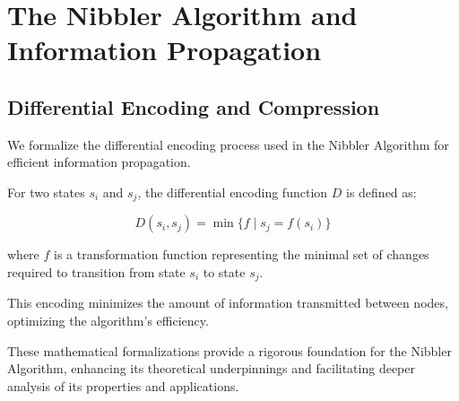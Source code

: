 \section{The Nibbler Algorithm and Information Propagation}

\subsection{Differential Encoding and Compression}

We formalize the differential encoding process used in the Nibbler Algorithm for efficient information propagation.

\begin{definition}
For two states $s_i$ and $s_j$, the differential encoding function $D$ is defined as:

\begin{equation}
D(s_i, s_j) = \min\{f \mid s_j = f(s_i)\}
\end{equation}

where $f$ is a transformation function representing the minimal set of changes required to transition from state $s_i$ to state $s_j$.
\end{definition}

This encoding minimizes the amount of information transmitted between nodes, optimizing the algorithm's efficiency.

These mathematical formalizations provide a rigorous foundation for the Nibbler Algorithm, enhancing its theoretical underpinnings and facilitating deeper analysis of its properties and applications.


